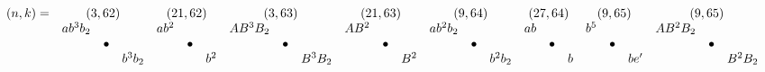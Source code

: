 \documentclass{article}
\begin{document}
\(
\begin{array}{crclrclrclrclrclrclrclrcl}
  (n,k)= & \multicolumn{3}{c}{(3,62)} & \multicolumn{3}{c}{(21,62)} & \multicolumn{3}{c}{(3,63)} & \multicolumn{3}{c}{(21,63)} & \multicolumn{3}{c}{(9,64)} & \multicolumn{3}{c}{(27,64)} & \multicolumn{3}{c}{(9,65)} & \multicolumn{3}{c}{(9,65)} \\
  & ab^3b_2 & & & ab^2 & & & AB^3B_2 & & & AB^2 & & & ab^2b_2 & & & ab & & & b^5 & & & AB^2B_2 & & \\
  & & \bullet & & & \bullet & & & \bullet & & & \bullet & & & \bullet & & & \bullet & & & \bullet & & & \bullet & \\
  & & & b^3b_2 & & & b^2 & & & B^3B_2 & & & B^2 & & & b^2b_2 & & & b & & & be' & & & B^2B_2 
\end{array}
\)\\
\end{document}
